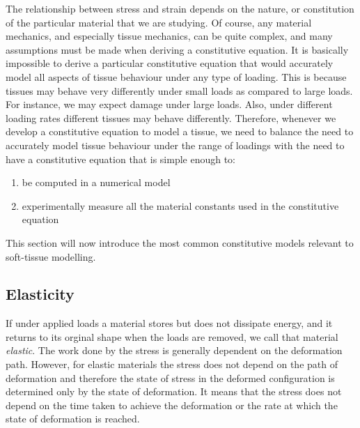 The relationship between stress and strain depends on the nature, or constitution of the particular material that we are studying. Of course, any material mechanics, and especially tissue mechanics, can be quite complex, and many assumptions must be made when deriving a constitutive equation. It is basically impossible to derive a particular constitutive equation that would accurately model all aspects of tissue behaviour under any type of loading. This is because tissues may behave very differently under small loads as compared to large loads. For instance, we may expect damage under large loads. Also, under different loading rates different tissues may behave differently. Therefore, whenever we develop a constitutive equation to model a tissue, we need to balance the need to accurately model tissue behaviour under the range of loadings with the need to have a constitutive equation that is simple enough to:
\begin{enumerate}
\item be computed in a numerical model 
\item experimentally measure all the material constants used in the constitutive equation
\end{enumerate}
This section will now introduce the most common constitutive models relevant to soft-tissue modelling. 
    
    
	\subsection{Elasticity}	
If under applied loads a material stores but does not dissipate energy, and it returns to its orginal shape when the loads are removed, we call that material \emph{elastic}. The work done by the stress is generally dependent on the deformation path. However, for elastic materials the stress does not depend on the path of deformation and therefore the state of stress in the deformed configuration is determined only by the state of deformation. It means that the stress does not depend on the time taken to achieve the deformation or the rate at which the state of deformation is reached. 

